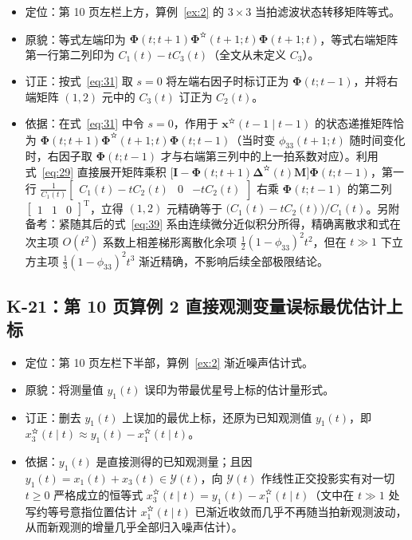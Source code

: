 \begin{itemize}
\item 定位：第 10 页左栏上方，算例~\ref{ex:2} 的 $3 \times 3$ 当拍滤波状态转移矩阵等式。
\item 原貌：等式左端印为 $\bm{\Phi}(t; t + 1)\bm{\Phi}^{\text{✫}}(t + 1; t)\bm{\Phi}(t + 1; t)$，等式右端矩阵第一行第二列印为 $C_1(t) - tC_3(t)$（全文从未定义 $C_3$）。
\item 订正：按式~\eqref{eq:31} 取 $s = 0$ 将左端右因子时标订正为 $\bm{\Phi}(t; t - 1)$，并将右端矩阵 $(1, 2)$ 元中的 $C_3(t)$ 订正为 $C_2(t)$。
\item 依据：在式~\eqref{eq:31} 中令 $s = 0$，作用于 $\bm{x}^{\text{✫}}(t - 1 \mid t - 1)$ 的状态递推矩阵恰为 $\bm{\Phi}(t; t + 1)\bm{\Phi}^{\text{✫}}(t + 1; t)\bm{\Phi}(t; t - 1)$（当时变 $\phi_{33}(t + 1; t)$ 随时间变化时，右因子取 $\bm{\Phi}(t; t - 1)$ 才与右端第三列中的上一拍系数对应）。利用式~\eqref{eq:29} 直接展开矩阵乘积 $\bigl[\bm{I} - \bm{\Phi}(t; t + 1)\bm{\Delta}^{\text{✫}}(t)\bm{M}\bigr]\bm{\Phi}(t; t - 1)$，第一行 $\frac{1}{C_1(t)}\begin{bmatrix} C_1(t) - tC_2(t) & 0 & -tC_2(t) \end{bmatrix}$ 右乘 $\bm{\Phi}(t; t - 1)$ 的第二列 $\begin{bmatrix} 1 & 1 & 0 \end{bmatrix}^{\mathrm{T}}$，立得 $(1, 2)$ 元精确等于 $\bigl(C_1(t) - tC_2(t)\bigr) / C_1(t)$。另附备考：紧随其后的式~\eqref{eq:39} 系由连续微分近似积分所得，精确离散求和式在次主项 $O(t^2)$ 系数上相差梯形离散化余项 $\frac{1}{2}(1 - \phi_{33})^2 t^2$，但在 $t \gg 1$ 下立方主项 $\frac{1}{3}(1 - \phi_{33})^2 t^3$ 渐近精确，不影响后续全部极限结论。
\end{itemize}

\subsection{K-21：第 10 页算例 2 直接观测变量误标最优估计上标}\label{sec:k21}

\begin{itemize}
\item 定位：第 10 页左栏下半部，算例~\ref{ex:2} 渐近噪声估计式。
\item 原貌：将测量值 $y_1(t)$ 误印为带最优星号上标的估计量形式。
\item 订正：删去 $y_1(t)$ 上误加的最优上标，还原为已知观测值 $y_1(t)$，即 $x_3^{\text{✫}}(t \mid t) \approx y_1(t) - x_1^{\text{✫}}(t \mid t)$。
\item 依据：$y_1(t)$ 是直接测得的已知观测量；且因 $y_1(t) = x_1(t) + x_3(t) \in \mathcal{Y}(t)$，向 $\mathcal{Y}(t)$ 作线性正交投影实有对一切 $t \geq 0$ 严格成立的恒等式 $x_3^{\text{✫}}(t \mid t) = y_1(t) - x_1^{\text{✫}}(t \mid t)$（文中在 $t \gg 1$ 处写约等号意指位置估计 $x_1^{\text{✫}}(t \mid t)$ 已渐近收敛而几乎不再随当拍新观测波动，从而新观测的增量几乎全部归入噪声估计）。
\end{itemize}

